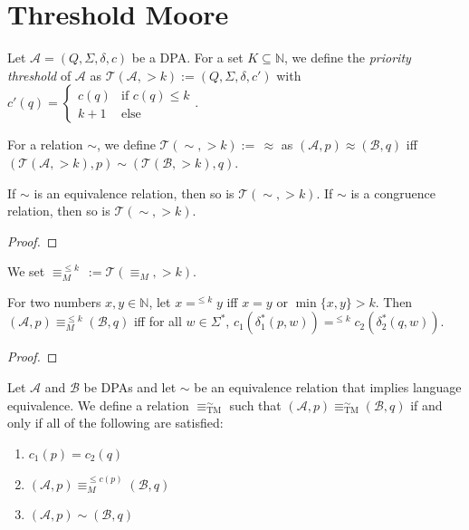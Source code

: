 \section{Threshold Moore}
\label{sect:tm}

\begin{defn}
	Let $\mathcal{A} = (Q, \Sigma, \delta, c)$ be a DPA. For a set $K \subseteq \mathbb{N}$, we define the \emph{priority threshold} of $\mathcal{A}$ as $\mathcal{T}(\mathcal{A}, >k) := (Q, \Sigma, \delta, c')$ with $c'(q) = \begin{cases} c(q) & \text{if } c(q) \leq k \\ k + 1 & \text{else} \end{cases}$.
	
	For a relation $\sim$, we define $\mathcal{T}(\sim, >k) :=\, \approx$ as $(\mathcal{A}, p) \approx (\mathcal{B}, q)$ iff $(\mathcal{T}(\mathcal{A}, >k), p) \sim (\mathcal{T}(\mathcal{B}, >k), q)$.
\end{defn}

\begin{lem}
	If $\sim$ is an equivalence relation, then so is $\mathcal{T}(\sim, >k)$. If $\sim$ is a congruence relation, then so is $\mathcal{T}(\sim, >k)$.
\end{lem}

\begin{proof}
\end{proof}

\begin{defn}
	We set $\equiv_M^{\leq k} \,:= \mathcal{T}(\equiv_M, >k)$.
\end{defn}

\begin{lem}
	For two numbers $x, y \in \mathbb{N}$, let $x =^{\leq k} y$ iff $x = y$ or $\min \{x, y\} > k$. Then $(\mathcal{A}, p) \equiv_M^{\leq k} (\mathcal{B}, q)$ iff for all $w \in \Sigma^*$, $c_1(\delta_1^*(p, w)) =^{\leq k} c_2(\delta_2^*(q, w))$.
\end{lem}

\begin{proof}
\end{proof}

\vspace{5pt}

\begin{defn}
	Let $\mathcal{A}$ and $\mathcal{B}$ be DPAs and let $\sim$ be an equivalence relation that implies language equivalence. We define a relation $\equiv_\text{TM}^\sim$ such that $(\mathcal{A}, p) \equiv^\sim_\text{TM} (\mathcal{B}, q)$ if and only if all of the following are satisfied:
	\begin{enumerate}
		\item $c_1(p) = c_2(q)$
		\item $(\mathcal{A}, p) \equiv_M^{\leq c(p)} (\mathcal{B}, q)$
		\item $(\mathcal{A}, p) \sim (\mathcal{B}, q)$
	\end{enumerate}
\end{defn}

